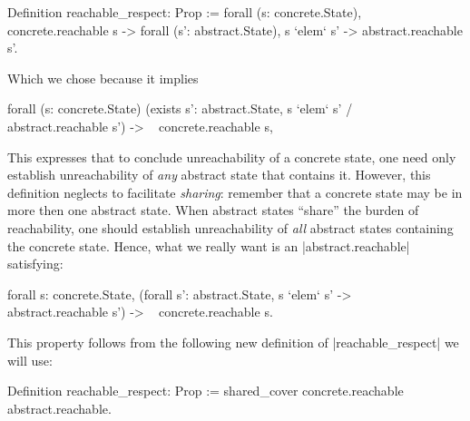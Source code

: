\documentclass[runningheads]{llncs}
\begin{document}
\begin{code}
Definition reachable_respect: Prop :=
  forall (s: concrete.State), concrete.reachable s ->
    forall (s': abstract.State), s `elem` s' -> abstract.reachable s'.
\end{code}
Which we chose because it implies
\begin{code}
forall (s: concrete.State)
  (exists s': abstract.State, s `elem` s' /\ ~ abstract.reachable s') ->
    ~ concrete.reachable s,
\end{code}
This expresses that to conclude unreachability of a concrete state,
one need only establish unreachability of \emph{any} abstract state
that contains it. However, this definition neglects to facilitate {\em
  sharing}: remember that a concrete state may be in more then one
abstract state. When abstract states ``share'' the burden of
reachability, one should establish unreachability of \emph{all}
abstract states containing the concrete state. Hence, what we really
want is an |abstract.reachable| satisfying:
\begin{code}
forall s: concrete.State,
  (forall s': abstract.State, s `elem` s' -> ~ abstract.reachable s') ->
  ~ concrete.reachable s.
\end{code}
This property follows from the following new definition of |reachable_respect| we will use:
\begin{code}
Definition reachable_respect: Prop :=
  shared_cover concrete.reachable abstract.reachable.
\end{code}
\end{document}
